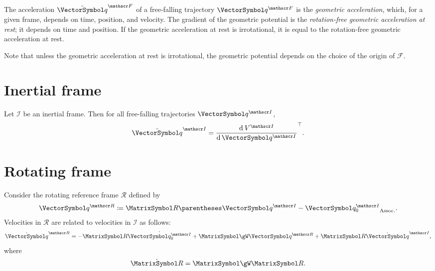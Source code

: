\documentclass[10pt, a4paper, twoside]{basestyle}
\begin{document}
The acceleration $\SecondTimeDerivative\vq^{\mathscr F}$ of a free-falling trajectory $\vq^{\mathscr F}$
is the \emph{geometric acceleration}, which, for a given frame, depends on time, position, and velocity.
The gradient of the geometric potential is the \emph{rotation-free geometric acceleration at rest}; it
depends on time and position. If the geometric acceleration at rest is irrotational, it is equal to the
rotation-free geometric acceleration at rest.

Note that unless the geometric acceleration at rest is irrotational, the geometric potential depends on
the choice of the origin of $\mathscr F$.

\section{Inertial frame}
Let $\mathscr I$ be an inertial frame. Then for all free-falling trajectories $\vq^{\mathscr I}$,
\begin{equation}
\SecondTimeDerivative\vq^{\mathscr I}=\Transpose{\deriv{\vq^{\mathscr I}}{V^{\mathscr I}}}\text.
\end{equation}
\section{Rotating frame}
Consider the rotating reference frame $\mathscr R$ defined by
\begin{equation}
\vq^{\mathscr R} \DefineAs \matR \pa{\vq^{\mathscr I} - \vq_0^{\mathscr I}}\text.
\end{equation}
Velocities in $\mathscr R$ are related to velocities in $\mathscr I$ as follows:
\begin{equation}
\TimeDerivative\vq^{\mathscr R} =  -  \matR \TimeDerivative{\vq_0^{\mathscr I}} + \MatrixSymbol\gW \vq^{\mathscr R} + \matR \TimeDerivative\vq^{\mathscr I}\text,
\end{equation}
where
\[
\TimeDerivative{\matR}=\MatrixSymbol\gW \matR\text.
\]
\end{document}

